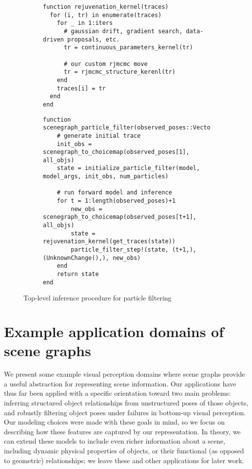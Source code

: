 \begin{figure}
\begin{subfigure}{\textwidth}
\begin{lstlisting}
function rejuvenation_kernel(traces)
  for (i, tr) in enumerate(traces)
    for _ in 1:iters
      # gaussian drift, gradient search, data-driven proposals, etc.
      tr = continuous_parameters_kernel(tr)

      # our custom rjmcmc move
      tr = rjmcmc_structure_kerenl(tr)
    end
    traces[i] = tr
  end
end
\end{lstlisting}
\end{subfigure}

\begin{subfigure}{\textwidth}
\begin{lstlisting}
function scenegraph_particle_filter(observed_poses::Vector{SceneGraph})
    # generate initial trace
    init_obs = scenegraph_to_choicemap(observed_poses[1], all_objs)
    state = initialize_particle_filter(model, model_args, init_obs, num_particles)

    # run forward model and inference
    for t = 1:length(observed_poses)+1
        new_obs = scenegraph_to_choicemap(observed_poses[t+1], all_objs)
        state = rejuvenation_kernel(get_traces(state))
        particle_filter_step!(state, (t+1,), (UnknownChange(),), new_obs)
    end
    return state
end
\end{lstlisting}
\end{subfigure}
\caption{Top-level inference procedure for particle filtering}
\label{fig:particleFilter}
\end{figure}


\section{Example application domains of scene graphs}
We present some example visual perception domains where scene graphs provide a useful abstraction for representing scene information.
Our applications have thus far been applied with a specific orientation toward two main problems: inferring structured object relationships from unstructured poses of those objects, and robustly filtering object poses under failures in bottom-up visual perception.
Our modeling choices were made with these goals in mind, so we focus on describing how these features are captured by our representation.
In theory, we can extend these models to include even richer information about a scene, including dynamic physical properties of objects, or their functional (as opposed to geometric) relationships; we leave these and other applications for later work.


